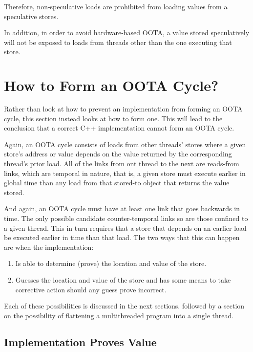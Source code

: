 \documentclass[10]{article}
\begin{document}
Therefore, non-speculative loads are prohibited from loading values from
a speculative stores.

In addition, in order to avoid hardware-based OOTA, a value stored
speculatively will not be exposed to loads from threads other than the
one executing that store.

\section{How to Form an OOTA Cycle?}
\label{sec:How to Form an OOTA Cycle?}

Rather than look at how to prevent an implementation from forming
an OOTA cycle, this section instead looks at how to form one.
This will lead to the conclusion that a correct C++ implementation
cannot form an OOTA cycle.

Again, an OOTA cycle consists of loads from other threads' stores where
a given store's address or value depends on the value returned by
the corresponding thread's prior load.
All of the links from ont thread to the next are reads-from links, which
are temporal in nature, that is, a given store must execute earlier in
global time than any load from that stored-to object that returns the
value stored.

And again, an OOTA cycle must have at least one link that goes backwards
in time.
The only possible candidate counter-temporal links so are those
confined to a given thread.
This in turn requires that a store that depends on an earlier load
be executed earlier in time than that load.
The two ways that this can happen are when the implementation:

\begin{enumerate}
\item	Is able to determine (prove) the location and value of the store.
\item	Guesses the location and value of the store and has some means
	to take corrective action should any guess prove incorrect.
\end{enumerate}

Each of these possibilities is discussed in the next sections.
followed by a section on the possibility of flattening a multithreaded
program into a single thread.

\subsection{Implementation Proves Value}
\label{sec:Implementation Proves Value}
\end{document}
